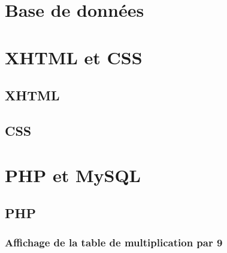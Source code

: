 \documentclass[12pt,a4paper,openany]{book}
\begin{document}
	\setcounter{tocdepth}{2}
	\setcounter{secnumdepth}{3}
	\maketitle
	\tableofcontents
	\part{Base de données}
	
	
	\part{XHTML et CSS}
	\chapter{XHTML}
	
	
	
	\chapter{CSS}
	\part{PHP et MySQL}
	\chapter{PHP}
	\section{Affichage de la table de multiplication par 9}
	
\end{document}
